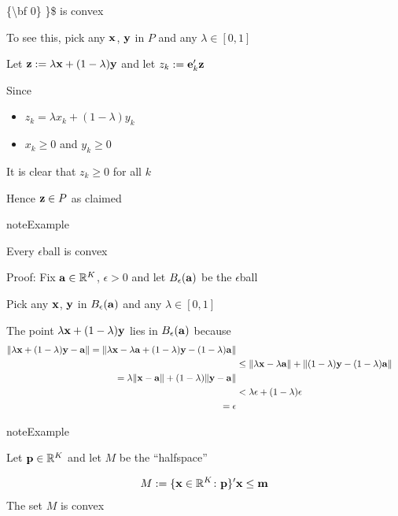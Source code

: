 \documentclass[letterpaper,10pt,english]{jupyterBook}
\begin{document}
\sphinxAtStartPar
\{\textbackslash{}bf 0\} \}\$ is convex

\sphinxAtStartPar
To see this, pick any \({\bf x}\), \({\bf y}\) in \(P\) and any \(\lambda \in [0, 1]\)

\sphinxAtStartPar
Let \({\bf z} := \lambda {\bf x} + (1 - \lambda) {\bf y}\) and let \(z_k :=
{\bf e}_k' {\bf z}\)

\sphinxAtStartPar
Since
\begin{itemize}
\item {} 
\sphinxAtStartPar
\(z_k = \lambda x_k + (1 - \lambda) y_k\)

\item {} 
\sphinxAtStartPar
\(x_k \geq 0\) and \(y_k \geq 0\)

\end{itemize}

\sphinxAtStartPar
It is clear that \(z_k \geq 0\) for all \(k\)

\sphinxAtStartPar
Hence \({\bf z} \in P\) as claimed

\begin{sphinxadmonition}{note}{Example}

\sphinxAtStartPar
Every \(\epsilon\)\sphinxhyphen{}ball is convex
\end{sphinxadmonition}

\sphinxAtStartPar
Proof: Fix \({\bf a} \in \mathbb{R}^K\), \(\epsilon > 0\) and let
\(B_\epsilon({\bf a})\) be the \(\epsilon\)\sphinxhyphen{}ball

\sphinxAtStartPar
Pick any \({\bf x}\), \({\bf y}\) in \(B_\epsilon({\bf a})\) and any \(\lambda \in [0, 1]\)

\sphinxAtStartPar
The point \(\lambda {\bf x} + (1 - \lambda) {\bf y}\) lies in
\(B_\epsilon({\bf a})\) because
\begin{equation*}
\begin{split}
%
\| \lambda {\bf x} + (1 - \lambda) {\bf y} - {\bf a} \|
= \| \lambda {\bf x} - \lambda {\bf a} 
+ (1 - \lambda) {\bf y} - (1 - \lambda) {\bf a} \|
\\
& \leq \| \lambda {\bf x} - \lambda {\bf a} \|
+ \| (1 - \lambda) {\bf y} - (1 - \lambda) {\bf a} \|
\\
= \lambda \| {\bf x} - {\bf a} \|
+ (1 - \lambda) \| {\bf y} - {\bf a} \|
\\
& < \lambda \epsilon + (1 - \lambda) \epsilon
\\
= \epsilon
%
\end{split}
\end{equation*}
\begin{sphinxadmonition}{note}{Example}

\sphinxAtStartPar
Let \({\bf p} \in \mathbb{R}^K\) and let \(M\) be the “half\sphinxhyphen{}space”
\end{sphinxadmonition}
\begin{equation*}
\begin{split}
%
M := \{ {\bf x} \in \mathbb{R}^K \colon {\bf p \}' {\bf x} \leq m}
%
\end{split}
\end{equation*}
\sphinxAtStartPar
The set \(M\) is convex
\end{document}
